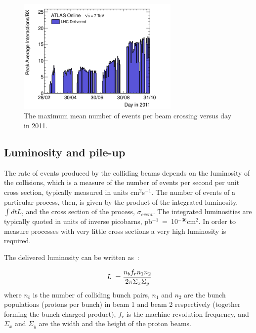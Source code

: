 \begin{figure}[htbp]
  \begin{center}
      \includegraphics[width=0.7\textwidth]{Fig2/peakAvgMuByDay.pdf}
    \caption{The maximum mean number of events per beam crossing versus day in 2011.}
    \label{fig:peakAvgMu}
  \end{center}
\end{figure}


\subsection{Luminosity and pile-up}\label{sec:lumiintro}

The rate of events produced by the colliding beams depends on the luminosity of the collisions, which is a measure of the number of events per second per unit cross section, typically measured in units cm$^2$s$^{-1}$. The number of events of a particular process, then, is given by the product of the integrated luminosity, $\int dt L$, and the cross section of the process, $\sigma_{event}$.  The integrated luminosities are typically quoted in units of inverse picobarns, pb$^{-1}$~=~10$^{-36}$cm$^{2}$. In order to measure processes with very little cross sections a very high luminosity is required. 

The delivered luminosity can be written as~\cite{ATLAS-CONF-2011-116}:

\begin{equation} 
\mbox{ {\it L }} = \frac{n_b f_r n_1 n_2 }{2\pi \Sigma_x \Sigma_y}
\label{eqn:lumi}
\end{equation} 
where $n_b$ is the number of colliding bunch pairs,  $n_1$ and $n_2$ are the bunch populations (protons per bunch) in beam 1 and beam 2 respectively (together forming the bunch charged product), $f_r$ is the machine revolution frequency, and $\Sigma_x$ and $\Sigma_y$ are the width and the height of the proton beams. %

